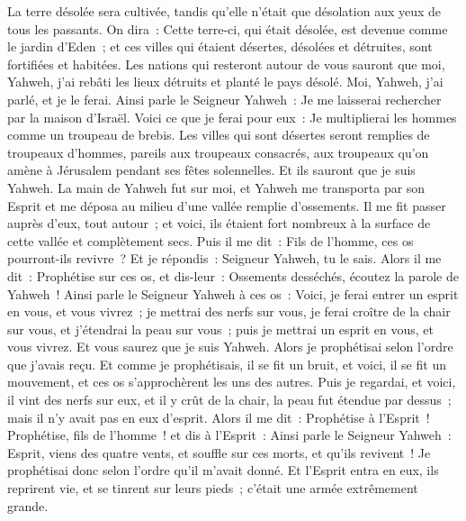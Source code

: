 \begin{multicols}{2}
La terre désolée sera cultivée, tandis qu'elle n'était que désolation aux yeux de tous les passants.
On dira~: Cette terre-ci, qui était désolée, est devenue comme le jardin d'Eden~; et ces villes qui étaient désertes, désolées et détruites, sont fortifiées et habitées.
Les nations qui resteront autour de vous sauront que moi, Yahweh, j'ai rebâti les lieux détruits et planté le pays désolé. Moi, Yahweh, j'ai parlé, et je le ferai.
Ainsi parle le Seigneur Yahweh~: Je me laisserai rechercher par la maison d'Israël. Voici ce que je ferai pour eux~: Je multiplierai les hommes comme un troupeau de brebis.
Les villes qui sont désertes seront remplies de troupeaux d'hommes, pareils aux troupeaux consacrés, aux troupeaux qu'on amène à Jérusalem pendant ses fêtes solennelles. Et ils sauront que je suis Yahweh.
\VerseOne{}La main de Yahweh fut sur moi, et Yahweh me transporta par son Esprit et me déposa au milieu d'une vallée remplie d'ossements.
Il me fit passer auprès d'eux, tout autour~; et voici, ils étaient fort nombreux à la surface de cette vallée et complètement secs.
Puis il me dit~: Fils de l'homme, ces os pourront-ils revivre~? Et je répondis~: Seigneur Yahweh, tu le sais.
Alors il me dit~: Prophétise sur ces os, et dis-leur~: Ossements desséchés, écoutez la parole de Yahweh~!
Ainsi parle le Seigneur Yahweh à ces os~: Voici, je ferai entrer un esprit en vous, et vous vivrez~;
je mettrai des nerfs sur vous, je ferai croître de la chair sur vous, et j'étendrai la peau sur vous~; puis je mettrai un esprit en vous, et vous vivrez. Et vous saurez que je suis Yahweh.
Alors je prophétisai selon l'ordre que j'avais reçu. Et comme je prophétisais, il se fit un bruit, et voici, il se fit un mouvement, et ces os s'approchèrent les uns des autres.
Puis je regardai, et voici, il vint des nerfs sur eux, et il y crût de la chair, la peau fut étendue par dessus~; mais il n'y avait pas en eux d'esprit.
Alors il me dit~: Prophétise à l'Esprit~! Prophétise, fils de l'homme~! et dis à l'Esprit~: Ainsi parle le Seigneur Yahweh~: Esprit, viens des quatre vents, et souffle sur ces morts, et qu'ils revivent~!
Je prophétisai donc selon l'ordre qu'il m'avait donné. Et l'Esprit entra en eux, ils reprirent vie, et se tinrent sur leurs pieds~; c'était une armée extrêmement grande.

\end{multicols}
